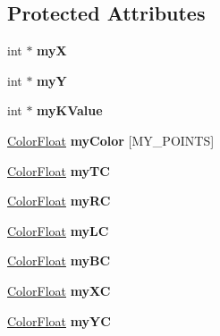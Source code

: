 \subsection*{Protected Attributes}
\begin{DoxyCompactItemize}
\item 
\mbox{\label{class_voronoi_a2a8abcf1315e24f6bcdec7cb770227e1}} 
int $\ast$ {\bfseries myX}
\item 
\mbox{\label{class_voronoi_a9cd6a2652edbfd784f445298aa37e6d5}} 
int $\ast$ {\bfseries myY}
\item 
\mbox{\label{class_voronoi_a08f37250fb89f418ab88108b5a540717}} 
int $\ast$ {\bfseries my\+K\+Value}
\item 
\mbox{\label{class_voronoi_ab045a015ecd18781b7f85ca5a25e34b0}} 
\hyperlink{structtsgl_1_1_color_float}{Color\+Float} {\bfseries my\+Color} \mbox{[}M\+Y\+\_\+\+P\+O\+I\+N\+TS\mbox{]}
\item 
\mbox{\label{class_voronoi_acf73f0b3520a85eb3993c2e8d4c1af9f}} 
\hyperlink{structtsgl_1_1_color_float}{Color\+Float} {\bfseries my\+TC}
\item 
\mbox{\label{class_voronoi_a0a279ca4843d2428f7d390bb0132b476}} 
\hyperlink{structtsgl_1_1_color_float}{Color\+Float} {\bfseries my\+RC}
\item 
\mbox{\label{class_voronoi_a698c522fa69e0c22fa4097bfa8151adc}} 
\hyperlink{structtsgl_1_1_color_float}{Color\+Float} {\bfseries my\+LC}
\item 
\mbox{\label{class_voronoi_a42fbe132a46a2b1de08f834567019804}} 
\hyperlink{structtsgl_1_1_color_float}{Color\+Float} {\bfseries my\+BC}
\item 
\mbox{\label{class_voronoi_aede98e9e4efbeb9675b818a376a91f4b}} 
\hyperlink{structtsgl_1_1_color_float}{Color\+Float} {\bfseries my\+XC}
\item 
\mbox{\label{class_voronoi_a6d30b50dfce140f4db8e66452f81e4b6}} 
\hyperlink{structtsgl_1_1_color_float}{Color\+Float} {\bfseries my\+YC}
\end{DoxyCompactItemize}

